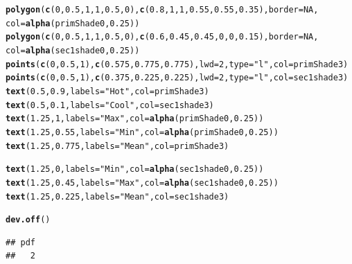 \documentclass[11pt, oneside]{article}\usepackage[]{graphicx}\usepackage[]{color}
\makeatletter
\newcommand{\hlnum}[1]{\textcolor[rgb]{0.686,0.059,0.569}{#1}}%
\newcommand{\hlstr}[1]{\textcolor[rgb]{0.192,0.494,0.8}{#1}}%
\newcommand{\hlstd}[1]{\textcolor[rgb]{0.345,0.345,0.345}{#1}}%
\newcommand{\hlkwc}[1]{\textcolor[rgb]{0.333,0.667,0.333}{#1}}%
\newcommand{\hlkwd}[1]{\textcolor[rgb]{0.737,0.353,0.396}{\textbf{#1}}}%
\newenvironment{kframe}{%
 \def\at@end@of@kframe{}%
 \ifinner\ifhmode%
  \def\at@end@of@kframe{\end{minipage}}%
  \begin{minipage}{\columnwidth}%
 \fi\fi%
 \def\FrameCommand##1{\hskip\@totalleftmargin \hskip-\fboxsep
 \colorbox{shadecolor}{##1}\hskip-\fboxsep
     \hskip-\linewidth \hskip-\@totalleftmargin \hskip\columnwidth}%
 \MakeFramed {\advance\hsize-\width
   \@totalleftmargin\z@ \linewidth\hsize
   \@setminipage}}%
 {\par\unskip\endMakeFramed%
 \at@end@of@kframe}
\newenvironment{knitrout}{}{} %
\makeatother
\begin{document}
\begin{knitrout}
\begin{kframe}
\begin{alltt}
\hlkwd{polygon}\hlstd{(}\hlkwd{c}\hlstd{(}\hlnum{0}\hlstd{,} \hlnum{0.5}\hlstd{,} \hlnum{1}\hlstd{,} \hlnum{1}\hlstd{,} \hlnum{0.5}\hlstd{,} \hlnum{0}\hlstd{),} \hlkwd{c}\hlstd{(}\hlnum{0.8}\hlstd{,} \hlnum{1}\hlstd{,} \hlnum{1}\hlstd{,} \hlnum{0.55}\hlstd{,} \hlnum{0.55}\hlstd{,} \hlnum{0.35}\hlstd{),} \hlkwc{border} \hlstd{=} \hlnum{NA}\hlstd{,}
                                \hlkwc{col} \hlstd{=} \hlkwd{alpha}\hlstd{(primShade0,} \hlnum{0.25}\hlstd{))}
\hlkwd{polygon}\hlstd{(}\hlkwd{c}\hlstd{(}\hlnum{0}\hlstd{,} \hlnum{0.5}\hlstd{,} \hlnum{1}\hlstd{,} \hlnum{1}\hlstd{,} \hlnum{0.5}\hlstd{,} \hlnum{0}\hlstd{),} \hlkwd{c}\hlstd{(}\hlnum{0.6}\hlstd{,} \hlnum{0.45}\hlstd{,} \hlnum{0.45}\hlstd{,} \hlnum{0}\hlstd{,} \hlnum{0}\hlstd{,} \hlnum{0.15}\hlstd{),} \hlkwc{border} \hlstd{=} \hlnum{NA}\hlstd{,}
                                \hlkwc{col} \hlstd{=} \hlkwd{alpha}\hlstd{(sec1shade0,} \hlnum{0.25}\hlstd{))}
\hlkwd{points}\hlstd{(}\hlkwd{c}\hlstd{(}\hlnum{0}\hlstd{,} \hlnum{0.5}\hlstd{,} \hlnum{1}\hlstd{),} \hlkwd{c}\hlstd{(}\hlnum{0.575}\hlstd{,} \hlnum{0.775}\hlstd{,} \hlnum{0.775}\hlstd{),} \hlkwc{lwd} \hlstd{=} \hlnum{2}\hlstd{,} \hlkwc{type} \hlstd{=} \hlstr{"l"}\hlstd{,} \hlkwc{col} \hlstd{= primShade3)}
\hlkwd{points}\hlstd{(}\hlkwd{c}\hlstd{(}\hlnum{0}\hlstd{,} \hlnum{0.5}\hlstd{,} \hlnum{1}\hlstd{),} \hlkwd{c}\hlstd{(}\hlnum{0.375}\hlstd{,} \hlnum{0.225}\hlstd{,} \hlnum{0.225}\hlstd{),} \hlkwc{lwd} \hlstd{=} \hlnum{2}\hlstd{,} \hlkwc{type} \hlstd{=} \hlstr{"l"}\hlstd{,} \hlkwc{col} \hlstd{= sec1shade3)}
\hlkwd{text}\hlstd{(}\hlnum{0.5}\hlstd{,} \hlnum{0.9}\hlstd{,} \hlkwc{labels} \hlstd{=} \hlstr{"Hot"}\hlstd{,} \hlkwc{col} \hlstd{= primShade3)}
\hlkwd{text}\hlstd{(}\hlnum{0.5}\hlstd{,} \hlnum{0.1}\hlstd{,} \hlkwc{labels} \hlstd{=} \hlstr{"Cool"}\hlstd{,} \hlkwc{col} \hlstd{= sec1shade3)}
\hlkwd{text}\hlstd{(}\hlnum{1.25}\hlstd{,} \hlnum{1}\hlstd{,} \hlkwc{labels} \hlstd{=} \hlstr{"Max"}\hlstd{,} \hlkwc{col} \hlstd{=} \hlkwd{alpha}\hlstd{(primShade0,} \hlnum{0.25}\hlstd{))}
\hlkwd{text}\hlstd{(}\hlnum{1.25}\hlstd{,} \hlnum{0.55}\hlstd{,} \hlkwc{labels} \hlstd{=} \hlstr{"Min"}\hlstd{,} \hlkwc{col} \hlstd{=} \hlkwd{alpha}\hlstd{(primShade0,} \hlnum{0.25}\hlstd{))}
\hlkwd{text}\hlstd{(}\hlnum{1.25}\hlstd{,} \hlnum{0.775}\hlstd{,} \hlkwc{labels} \hlstd{=} \hlstr{"Mean"}\hlstd{,} \hlkwc{col} \hlstd{= primShade3)}

\hlkwd{text}\hlstd{(}\hlnum{1.25}\hlstd{,} \hlnum{0}\hlstd{,} \hlkwc{labels} \hlstd{=} \hlstr{"Min"}\hlstd{,} \hlkwc{col} \hlstd{=} \hlkwd{alpha}\hlstd{(sec1shade0,} \hlnum{0.25}\hlstd{))}
\hlkwd{text}\hlstd{(}\hlnum{1.25}\hlstd{,} \hlnum{0.45}\hlstd{,} \hlkwc{labels} \hlstd{=} \hlstr{"Max"}\hlstd{,} \hlkwc{col} \hlstd{=} \hlkwd{alpha}\hlstd{(sec1shade0,} \hlnum{0.25}\hlstd{))}
\hlkwd{text}\hlstd{(}\hlnum{1.25}\hlstd{,} \hlnum{0.225}\hlstd{,} \hlkwc{labels} \hlstd{=} \hlstr{"Mean"}\hlstd{,} \hlkwc{col} \hlstd{= sec1shade3)}

\hlkwd{dev.off}\hlstd{()}
\end{alltt}
\begin{verbatim}
## pdf 
##   2
\end{verbatim}
\end{kframe}
\end{knitrout}
\end{document}
